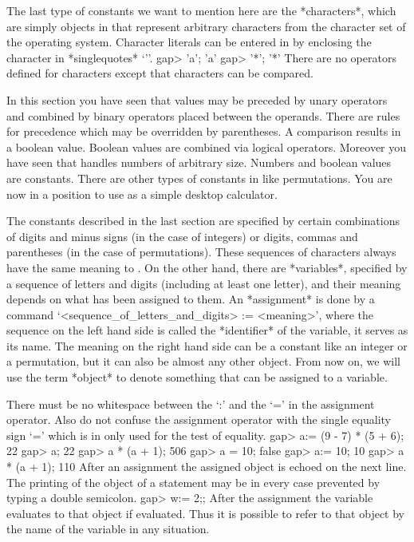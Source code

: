 The    last  type  of   constants  we  want  to mention    here are the
*characters*, which are simply objects in {\GAP} that represent arbitrary
characters  from  the character set   of the  operating system. Character
literals can  be  entered   in  {\GAP} by  enclosing  the   character  in
*singlequotes* `{'}'.
\beginexample
    gap> 'a';
    'a'
    gap> '*';
    '*' 
\endexample
There are no  operators defined for characters except that characters can
be compared.

In this  section you  have  seen that values  may  be preceded  by  unary
operators  and combined by  binary operators placed between the operands.
There are rules for precedence which may be overridden by parentheses.  A
comparison  results in a boolean value.   Boolean values are combined via
logical operators.  Moreover you have seen that {\GAP} handles numbers of
arbitrary size.   Numbers and boolean   values are constants.   There are
other types of  constants in {\GAP} like permutations.   You are now in a
position to use {\GAP} as a simple desktop calculator.

\null

%
%
The  constants described  in the  last  section are  specified by certain
combinations   of digits and  minus  signs (in  the case  of integers) or
digits,  commas  and parentheses  (in   the case  of permutations). These
sequences of characters always  have the same meaning  to {\GAP}.  On the
other hand, there are *variables*, specified by a sequence of letters and
digits (including at least one letter), and their meaning depends on what
has been  assigned to them.  An *assignment* is  done by a {\GAP} command
`<sequence_of_letters_and_digits> := <meaning>',  where the  sequence  on
the left hand side is called the *identifier*  of the variable, it serves
as its name. The meaning on the right hand side can be a constant like an
integer or  a  permutation, but  it can  also be almost  any other {\GAP}
object. From now on,  we will use the  term *object* to denote  something
that can be assigned to a variable.

There must be no whitespace between the `:' and the `=' in the assignment
operator.  Also do not confuse  the  assignment operator with the  single
equality sign `=' which is in {\GAP} only used for the test of equality.
\beginexample
    gap> a:= (9 - 7) * (5 + 6);
    22
    gap> a;
    22
    gap> a * (a + 1);
    506
    gap> a = 10;
    false
    gap> a:= 10;
    10
    gap> a * (a + 1);
    110 
\endexample
After an assignment the assigned object is echoed on the  next line.  The
printing of the  object of a statement may  be in every case prevented by
typing a double semicolon.
\beginexample
    gap> w:= 2;; 
\endexample
After the assignment the variable evaluates  to that object if evaluated.
Thus it is possible to  refer to that object by  the name of the variable
in any situation.


